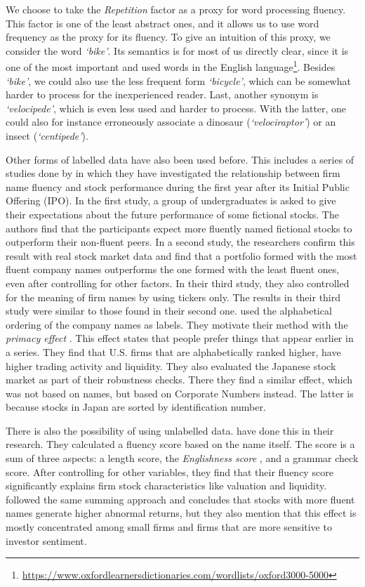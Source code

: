 \documentclass[11pt]{article}
\begin{document}
We choose to take the \textit{Repetition} factor as a proxy for word processing fluency. This factor is one of the least abstract ones, and it allows us to use word frequency as the proxy for its fluency. To give an intuition of this proxy, we consider the word \textit{`bike'}. Its semantics is for most of us directly clear, since it is one of the most important and used words in the English language\footnote{\url{https://www.oxfordlearnersdictionaries.com/wordlists/oxford3000-5000}}. Besides \textit{`bike'}, we could also use the less frequent form \textit{`bicycle'}, which can be somewhat harder to process for the inexperienced reader. Last, another synonym is \textit{`velocipede'}, which is even less used and harder to process. With the latter, one could also for instance erroneously associate a dinosaur (\textit{`velociraptor'}) or an insect (\textit{`centipede'}).

Other forms of labelled data have also been used before. This includes a series of studies done by \cite{alter2006predicting} in which they have investigated the relationship between firm name fluency and stock performance during the first year after its Initial Public Offering (IPO). In the first study, a group of undergraduates is asked to give their expectations about the future performance of some fictional stocks. The authors find that the participants expect more fluently named fictional stocks to outperform their non-fluent peers.
In a second study, the researchers confirm this result with real stock market data and find that a portfolio formed with the most fluent company names outperforms the one formed with the least fluent ones, even after controlling for other factors. 
In their third study, they also controlled for the meaning of firm names by using tickers only.
The results in their third study were similar to those found in their second one. \cite{jacobs2016alphabetic} used the alphabetical ordering of the company names as labels. They motivate their method with the \textit{primacy effect} \citep{carney2012first}. This effect states that people prefer things that appear earlier in a series. They find that U.S. firms that are alphabetically ranked higher, have higher trading activity and liquidity. They also evaluated the Japanese stock market as part of their robustness checks. There they  find a similar effect, which was not based on names, but based on Corporate Numbers instead. The latter is because stocks in Japan are sorted by identification number.

There is also the possibility of using unlabelled data. \cite{green2013company} have done this in their research. They calculated a fluency score based on the name itself. The score is a sum of three aspects: a length score, the \textit{Englishness score} \citep{travers1978pronounceability}, and a grammar check score. After controlling for other variables, they find that their fluency score significantly explains firm stock characteristics like valuation and liquidity. \cite{van2018company} followed the same summing approach and concludes that stocks with more fluent names generate higher abnormal returns, but they also mention that this effect is mostly concentrated among small firms and firms that are more sensitive to investor sentiment. 
\end{document}
